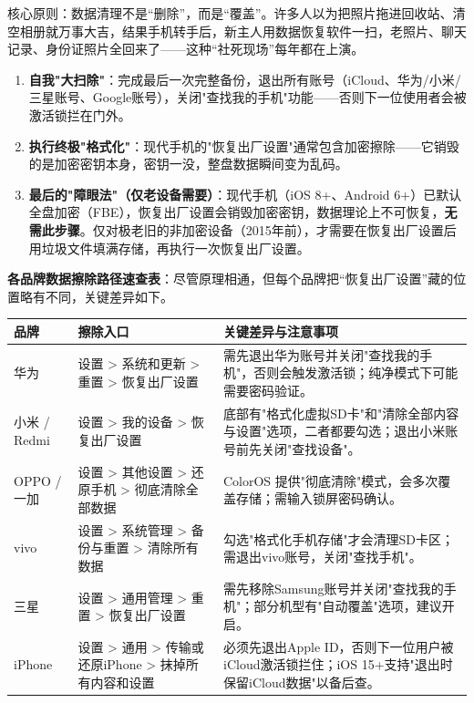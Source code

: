 


核心原则：数据清理不是“删除”，而是“覆盖”。许多人以为把照片拖进回收站、清空相册就万事大吉，结果手机转手后，新主人用数据恢复软件一扫，老照片、聊天记录、身份证照片全回来了——这种“社死现场”每年都在上演。

\begin{enumerate}
  \item \textbf{自我"大扫除"}：完成最后一次完整备份，退出所有账号（iCloud、华为/小米/三星账号、Google账号），关闭"查找我的手机"功能——否则下一位使用者会被激活锁拦在门外。
  \item \textbf{执行终极"格式化"}：现代手机的"恢复出厂设置"通常包含加密擦除——它销毁的是加密密钥本身，密钥一没，整盘数据瞬间变为乱码。
  \item \textbf{最后的"障眼法"（仅老设备需要）}：现代手机（iOS 8+、Android 6+）已默认全盘加密（FBE），恢复出厂设置会销毁加密密钥，数据理论上不可恢复，\textbf{无需此步骤}。仅对极老旧的非加密设备（2015年前），才需要在恢复出厂设置后用垃圾文件填满存储，再执行一次恢复出厂设置。
\end{enumerate}

\textbf{各品牌数据擦除路径速查表}：尽管原理相通，但每个品牌把“恢复出厂设置”藏的位置略有不同，关键差异如下。

\begin{center}
\begin{tabularx}{\linewidth}{|X|X|X|}
\hline
\textbf{品牌} & \textbf{擦除入口} & \textbf{关键差异与注意事项} \tabularnewline
\hline
华为 & 设置 > 系统和更新 > 重置 > 恢复出厂设置 & 需先退出华为账号并关闭"查找我的手机"，否则会触发激活锁；纯净模式下可能需要密码验证。 \tabularnewline
小米 / Redmi & 设置 > 我的设备 > 恢复出厂设置 & 底部有"格式化虚拟SD卡"和"清除全部内容与设置"选项，二者都要勾选；退出小米账号前先关闭"查找设备"。 \tabularnewline
OPPO / 一加 & 设置 > 其他设置 > 还原手机 > 彻底清除全部数据 & ColorOS 提供"彻底清除"模式，会多次覆盖存储；需输入锁屏密码确认。 \tabularnewline
vivo & 设置 > 系统管理 > 备份与重置 > 清除所有数据 & 勾选"格式化手机存储"才会清理SD卡区；需退出vivo账号，关闭"查找手机"。 \tabularnewline
三星 & 设置 > 通用管理 > 重置 > 恢复出厂设置 & 需先移除Samsung账号并关闭"查找我的手机"；部分机型有"自动覆盖"选项，建议开启。 \tabularnewline
iPhone & 设置 > 通用 > 传输或还原iPhone > 抹掉所有内容和设置 & 必须先退出Apple ID，否则下一位用户被iCloud激活锁拦住；iOS 15+支持"退出时保留iCloud数据"以备后查。 \tabularnewline
\hline
\end{tabularx}
\end{center}

